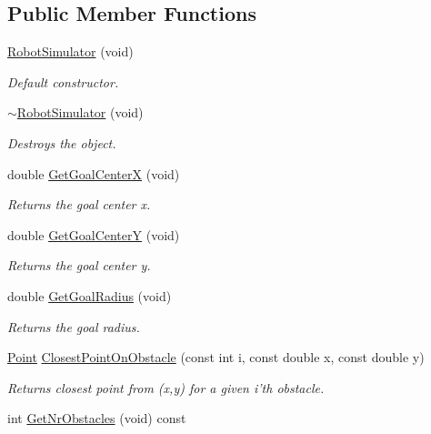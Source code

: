 \subsection*{Public Member Functions}
\begin{DoxyCompactItemize}
\item 
\hyperlink{classRobotSimulator_a05c69560bba897588fef7567cb23d5e8}{Robot\-Simulator} (void)
\begin{DoxyCompactList}\small\item\em Default constructor. \end{DoxyCompactList}\item 
\hyperlink{classRobotSimulator_a409ed4b76d901a102687a87933f512b9}{$\sim$\-Robot\-Simulator} (void)
\begin{DoxyCompactList}\small\item\em Destroys the object. \end{DoxyCompactList}\item 
double \hyperlink{classRobotSimulator_a7e26ec222d3524872e4e48f2188b385f}{Get\-Goal\-Center\-X} (void)
\begin{DoxyCompactList}\small\item\em Returns the goal center x. \end{DoxyCompactList}\item 
double \hyperlink{classRobotSimulator_a11ef47f5c24415d1ae2422de45969910}{Get\-Goal\-Center\-Y} (void)
\begin{DoxyCompactList}\small\item\em Returns the goal center y. \end{DoxyCompactList}\item 
double \hyperlink{classRobotSimulator_a69decfa495b2aa982bcb0b454e02a529}{Get\-Goal\-Radius} (void)
\begin{DoxyCompactList}\small\item\em Returns the goal radius. \end{DoxyCompactList}\item 
\hyperlink{structPoint}{Point} \hyperlink{classRobotSimulator_aeac39519c3c9672bd4e43d9e9a1233bd}{Closest\-Point\-On\-Obstacle} (const int i, const double x, const double y)
\begin{DoxyCompactList}\small\item\em Returns closest point from (x,y) for a given i'th obstacle. \end{DoxyCompactList}\item 
int \hyperlink{classRobotSimulator_a5e2c13048d6e6c364019c07bf8bac220}{Get\-Nr\-Obstacles} (void) const 

\end{DoxyCompactItemize}
